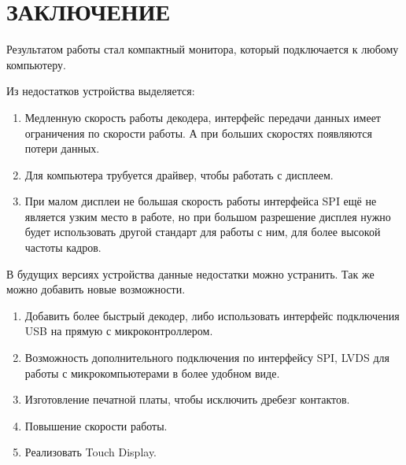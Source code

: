 \chapter*{ЗАКЛЮЧЕНИЕ}

	Результатом работы стал компактный монитора, который подключается к любому компьютеру. 
	
	Из недостатков устройства выделяется:
	
	\begin{enumerate}
		\item Медленную скорость работы декодера, интерфейс передачи данных имеет ограничения по скорости работы. А при больших скоростях появляются потери данных.
		\item Для компьютера трубуется драйвер, чтобы работать с дисплеем.
		\item При малом дисплеи не большая скорость работы интерфейса SPI ещё не является узким место в работе, но при большом разрешение дисплея нужно будет использовать другой стандарт для работы с ним, для более высокой частоты кадров.
	\end{enumerate}

	В будущих версиях устройства данные недостатки можно устранить. Так же можно добавить новые возможности.
	
	\begin{enumerate}
		\item Добавить более быстрый декодер, либо использовать интерфейс подключения USB на прямую с микроконтроллером.
		\item Возможность дополнительного подключения по интерфейсу SPI, LVDS для работы с микрокомпьютерами в более удобном виде.
		\item Изготовление печатной платы, чтобы исключить дребезг контактов.
		\item Повышение скорости работы.
		\item Реализовать Touch Display.
	\end{enumerate}
